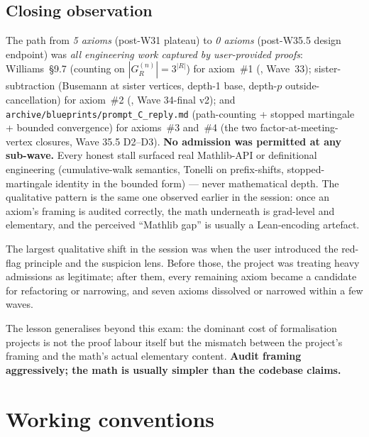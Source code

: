 \documentclass[11pt,a4paper]{article}
\theoremstyle{plain}
\theoremstyle{definition}
\begin{document}
\subsection{Closing observation}

The path from \emph{5 axioms} (post-W31 plateau) to \emph{0 axioms}
(post-W35.5 design endpoint) was \emph{all engineering work captured
by user-provided proofs}: Williams~\S9.7 (counting on
$|G_R^{(n)}| = 3^{|R|}$) for axiom~\#1
(, Wave~33);
sister-subtraction (Busemann at sister vertices, depth-1 base,
depth-$p$ outside-cancellation) for axiom~\#2
(, Wave 34-final v2);
and \texttt{archive/blueprints/prompt\_C\_reply.md} (path-counting
+ stopped martingale + bounded convergence) for axioms~\#3 and~\#4
(the two factor-at-meeting-vertex closures, Wave 35.5 D2--D3).
\textbf{No admission was permitted at any sub-wave.} Every honest
stall surfaced real Mathlib-API or definitional engineering
(cumulative-walk semantics, Tonelli on prefix-shifts,
stopped-martingale identity in the bounded form) --- never
mathematical depth. The qualitative pattern is the same one observed
earlier in the session: once an axiom's framing is audited correctly,
the math underneath is grad-level and elementary, and the perceived
``Mathlib gap'' is usually a Lean-encoding artefact.

The largest qualitative shift in the session was when the user
introduced the red-flag principle and the suspicion lens. Before
those, the project was treating heavy admissions as legitimate; after
them, every remaining axiom became a candidate for refactoring or
narrowing, and seven axioms dissolved or narrowed within a few waves.

The lesson generalises beyond this exam: the dominant cost of
formalisation projects is not the proof labour itself but the
mismatch between the project's framing and the math's actual
elementary content. \textbf{Audit framing aggressively; the math is
usually simpler than the codebase claims.}

\section{Working conventions}
\end{document}
